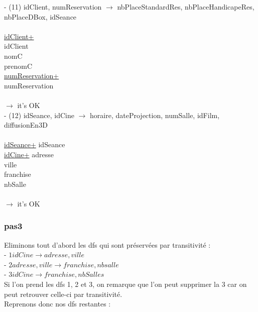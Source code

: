 \documentclass[a4paper,sffamily,12pt]{article}
\begin{document}
						\noindent - (11) idClient, numReservation $\rightarrow$ nbPlaceStandardRes, nbPlaceHandicapeRes, nbPlaceDBox, idSeance \\
							\\
							\underline{idClient+} \\
							idClient \\
							nomC \\
							prenomC \\
							\underline{numReservation+} \\
							numReservation \\	
							\\									
						$\rightarrow$ it's OK \\					
						
						\noindent - (12) idSeance, idCine $\rightarrow$ horaire, dateProjection, numSalle, idFilm, diffusionEn3D \\												
						\\
						\underline{idSeance+}
						idSeance \\
						\underline{idCine+}
						adresse \\
						ville \\
						franchise \\
						nbSalle \\
						\\
						$\rightarrow$ it's OK \\
		
					\subsubsection{pas3}		
			
						Eliminons tout d'abord les dfs qui sont préservées par transitivité : \\
			
							\noindent- $ 1 idCine \rightarrow adresse, ville$ \\
							- $2 adresse, ville \rightarrow franchise, nbsalle$ \\
							- $ 3 idCine \rightarrow franchise, nbSalles$ \\
							
							Si l'on prend les dfs 1, 2 et 3, on remarque que l'on peut supprimer la 3 car on peut retrouver celle-ci par transitivité. \\
							Reprenons donc nos dfs restantes : \\
							
\end{document}
